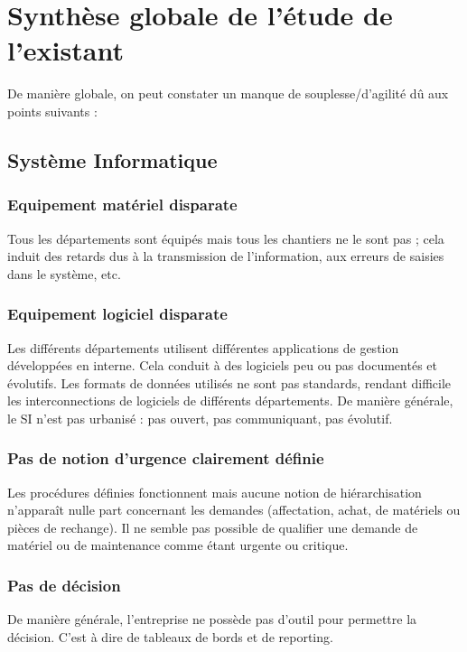 \section{Synthèse globale de l'étude de l'existant}

De manière globale, on peut constater un manque de souplesse/d'agilité dû
aux points suivants :

\subsection{Système Informatique}

\subsubsection{Equipement matériel disparate}
Tous les départements sont équipés mais tous les chantiers ne le sont pas ;
cela induit des retards dus à la transmission de l'information, aux erreurs
de saisies dans le système, etc.  

\subsubsection{Equipement logiciel disparate}
Les différents départements utilisent différentes applications de gestion
développées en interne. Cela conduit à des logiciels peu ou pas documentés
et évolutifs. Les formats de données utilisés ne sont pas standards,
rendant difficile les interconnections de logiciels de différents
départements. De manière générale, le SI n'est pas urbanisé : pas ouvert,
pas communiquant, pas évolutif.

\subsubsection{Pas de notion d'urgence clairement définie}
Les procédures définies fonctionnent mais aucune notion de hiérarchisation
n'apparaît nulle part concernant les demandes (affectation, achat, de
matériels ou pièces de rechange).  Il ne semble pas possible de qualifier
une demande de matériel ou de maintenance comme étant urgente ou critique.

\subsubsection{Pas de décision}

De manière générale, l'entreprise ne possède pas d'outil pour permettre la 
décision. C'est à dire de tableaux de bords et de reporting.

